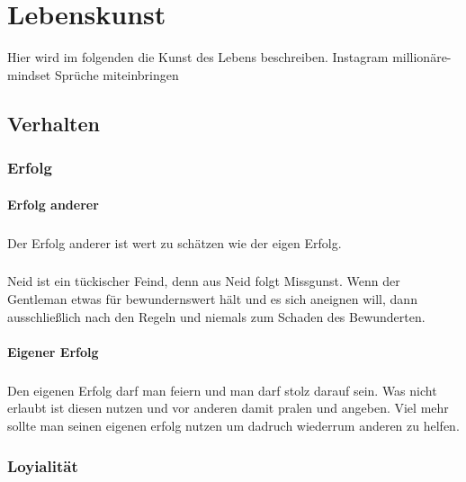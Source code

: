 \chapter{Lebenskunst} 
    \begin{thesis_quotation}

    \end{thesis_quotation}
    
    Hier wird im folgenden die Kunst des Lebens beschreiben. 
    {\color{red}Instagram millionäre-mindset Sprüche miteinbringen }
    
    \section{Verhalten}
        \subsection{Erfolg}
            \subsubsection{Erfolg anderer}
                \paragraph{} Der Erfolg anderer ist wert zu schätzen wie der eigen Erfolg.
                \paragraph{} Neid ist ein tückischer Feind, denn aus Neid folgt Missgunst. Wenn der Gentleman etwas für bewundernswert hält und es sich aneignen will, dann ausschließlich
                nach den Regeln und niemals zum Schaden des Bewunderten.
                \subsubsection{Eigener Erfolg}
                \paragraph{} Den eigenen Erfolg darf man feiern und man darf stolz darauf sein. Was nicht erlaubt ist diesen nutzen und vor anderen damit pralen und angeben. Viel mehr sollte man seinen eigenen erfolg nutzen um dadruch wiederrum anderen zu helfen.
        \subsection{Loyialität}
